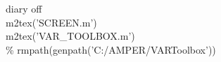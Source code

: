\hspace{1mm}\hspace{5mm} \hspace{5mm} \hspace{5mm} diary off \\ 
\hspace{1mm}\hspace{5mm} \hspace{5mm} \hspace{5mm} m2tex(\textcolor{matlabpurple}{'SCREEN.m'}) \\ 
\hspace{1mm}\hspace{5mm} \hspace{5mm} \hspace{5mm} m2tex(\textcolor{matlabpurple}{'VAR\_TOOLBOX.m'}) \\ 
\hspace{1mm}\hspace{5mm} \hspace{5mm} \hspace{5mm} \textcolor{matlabgreen}{\% rmpath(genpath('C:/AMPER/VARToolbox')) }\\ 
\hspace{1mm}\hspace{5mm} \hspace{5mm} \hspace{5mm}  \\ 
\hspace{1mm}\hspace{5mm} \hspace{5mm} \hspace{5mm}  \\ 
